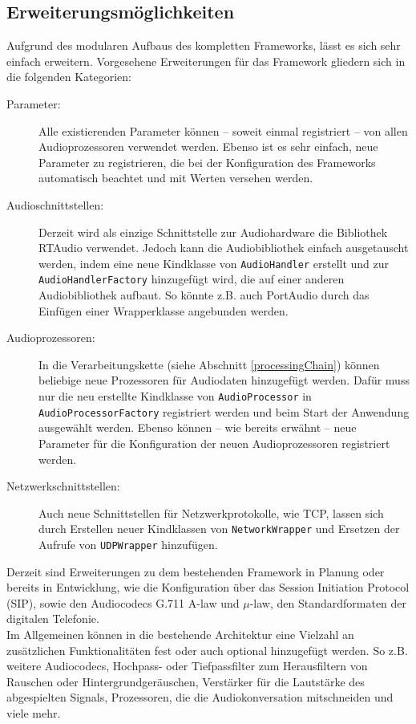\subsection{Erweiterungsmöglichkeiten}
Aufgrund des modularen Aufbaus des kompletten Frameworks, lässt es sich sehr einfach erweitern. Vorgesehene Erweiterungen für das Framework gliedern sich in die folgenden Kategorien:
\begin{description}
\item[Parameter:] Alle existierenden Parameter können -- soweit einmal registriert -- von allen Audioprozessoren verwendet werden. Ebenso ist es sehr einfach, neue Parameter zu registrieren, die bei der Konfiguration des Frameworks automatisch beachtet und mit Werten versehen werden.
\item[Audioschnittstellen:] Derzeit wird als einzige Schnittstelle zur Audiohardware die Bibliothek RTAudio verwendet. Jedoch kann die Audiobibliothek einfach ausgetauscht werden, indem eine neue Kindklasse von \texttt{AudioHandler} erstellt und zur \texttt{AudioHandlerFactory} hinzugefügt wird, die auf einer anderen Audiobibliothek aufbaut. So könnte z.B. auch PortAudio durch das Einfügen einer Wrapperklasse angebunden werden.
\item[Audioprozessoren:] In die Verarbeitungskette (siehe Abschnitt \ref{processingChain}) können beliebige neue Prozessoren für Audiodaten hinzugefügt werden. Dafür muss nur die neu erstellte Kindklasse von \texttt{AudioProcessor} in \texttt{AudioProcessorFactory} registriert werden und beim Start der Anwendung ausgewählt werden. Ebenso können -- wie bereits erwähnt -- neue Parameter für die Konfiguration der neuen Audioprozessoren registriert werden.
\item[Netzwerkschnittstellen:] Auch neue Schnittstellen für Netzwerkprotokolle, wie TCP, lassen sich durch Erstellen neuer Kindklassen von \texttt{NetworkWrapper} und Ersetzen der Aufrufe von \texttt{UDPWrapper} hinzufügen.
\end{description}
Derzeit sind Erweiterungen zu dem bestehenden Framework in Planung oder bereits in Entwicklung, wie die Konfiguration über das Session Initiation Protocol (SIP), sowie den Audiocodecs G.711 A-law und $\mu$-law, den Standardformaten der digitalen Telefonie.
\\
Im Allgemeinen können in die bestehende Architektur eine Vielzahl an zusätzlichen Funktionalitäten fest oder auch optional hinzugefügt werden. So z.B. weitere Audiocodecs, Hochpass- oder Tiefpassfilter zum Herausfiltern von Rauschen oder Hintergrundgeräuschen, Verstärker für die Lautstärke des abgespielten Signals, Prozessoren, die die Audiokonversation mitschneiden und viele mehr.

